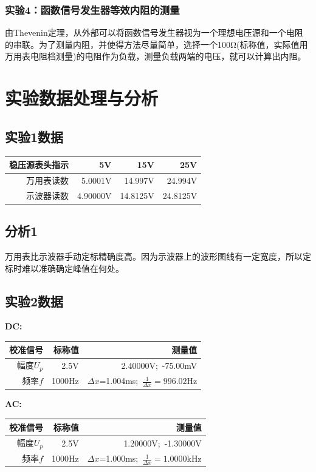 \documentclass[a4paper,11pt,UTF8]{ctexart}
\begin{document}
	\subsubsection{实验4：函数信号发生器等效内阻的测量}
		由Thevenin定理，从外部可以将函数信号发生器视为一个理想电压源和一个电阻的串联。为了测量内阻，并使得方法尽量简单，选择一个100Ω(标称值，实际值用万用表电阻档测量)的电阻作为负载，测量负载两端的电压，就可以计算出内阻。
\section{实验数据处理与分析}
\subsection{实验1数据}
		\begin{center}
	\begin{tabular}{|r|r|r|r|}
	\hline
	稳压源表头指示 & 5V & 15V & 25V\\
	\hline
	万用表读数 & 5.0001V & 14.997V & 24.994V\\
	\hline
	示波器读数 & 4.90000V & 14.8125V & 24.8125V\\
	\hline
		\end{tabular}
		\end{center}
\subsection{分析1}
	万用表比示波器手动定标精确度高。因为示波器上的波形图线有一定宽度，所以定标时难以准确确定峰值在何处。
\subsection{实验2数据}
	\textbf{DC:}
	\begin{center}
	\begin{tabular}{|r|r|r|}\hline
	校准信号 & 标称值 & 测量值\\\hline
	幅度$U_p$ & 2.5V & 2.40000V;~-75.00mV\\\hline
	频率$f$ & 1000Hz & $\Delta x$=1.004ms;~$\frac{1}{\Delta x}=996.02$Hz\\\hline
		\end{tabular}
		\end{center}
	\par\textbf{AC:}
	\begin{center}
	\begin{tabular}{|r|r|r|}\hline
	校准信号 & 标称值 & 测量值\\\hline
	幅度$U_p$ & 2.5V & 1.20000V;~-1.30000V\\\hline
	频率$f$ & 1000Hz & $\Delta x$=1.000ms;~$\frac{1}{\Delta x}=1.0000$kHz\\\hline
		\end{tabular}
		\end{center}
\end{document}
